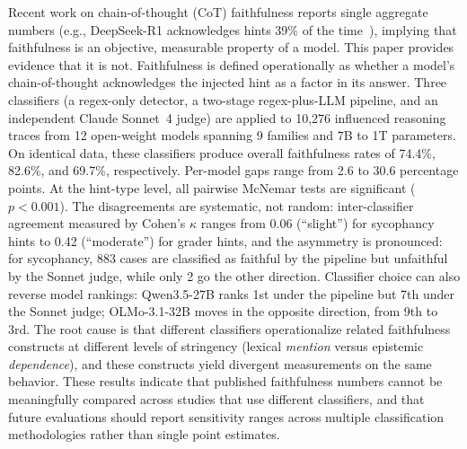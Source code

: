 Recent work on chain-of-thought (CoT) faithfulness reports single aggregate numbers (e.g., DeepSeek-R1 acknowledges hints 39\% of the time~\cite{chen2025reasoning}), implying that faithfulness is an objective, measurable property of a model. This paper provides evidence that it is not. Faithfulness is defined operationally as whether a model's chain-of-thought acknowledges the injected hint as a factor in its answer. Three classifiers (a regex-only detector, a two-stage regex-plus-LLM pipeline, and an independent Claude Sonnet~4 judge) are applied to 10,276 influenced reasoning traces from 12 open-weight models spanning 9 families and 7B to 1T parameters. On identical data, these classifiers produce overall faithfulness rates of 74.4\%, 82.6\%, and 69.7\%, respectively. Per-model gaps range from 2.6 to 30.6 percentage points. At the hint-type level, all pairwise McNemar tests are significant ($p < 0.001$). The disagreements are systematic, not random: inter-classifier agreement measured by Cohen's $\kappa$ ranges from 0.06 (``slight'') for sycophancy hints to 0.42 (``moderate'') for grader hints, and the asymmetry is pronounced: for sycophancy, 883 cases are classified as faithful by the pipeline but unfaithful by the Sonnet judge, while only 2 go the other direction. Classifier choice can also reverse model rankings: Qwen3.5-27B ranks 1st under the pipeline but 7th under the Sonnet judge; OLMo-3.1-32B moves in the opposite direction, from 9th to 3rd. The root cause is that different classifiers operationalize related faithfulness constructs at different levels of stringency (lexical \emph{mention} versus epistemic \emph{dependence}), and these constructs yield divergent measurements on the same behavior. These results indicate that published faithfulness numbers cannot be meaningfully compared across studies that use different classifiers, and that future evaluations should report sensitivity ranges across multiple classification methodologies rather than single point estimates.

